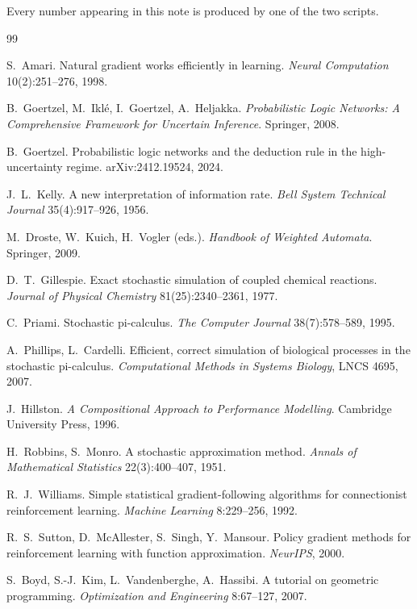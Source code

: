 \documentclass[11pt,a4paper]{article}
\theoremstyle{plain}
\theoremstyle{definition}
\theoremstyle{remark}
\begin{document}
Every number appearing in this note is produced by one of the two scripts.

\begin{thebibliography}{99}

S.~Amari. Natural gradient works efficiently in learning.
\emph{Neural Computation} 10(2):251--276, 1998.

B.~Goertzel, M.~Ikl\'e, I.~Goertzel, A.~Heljakka.
\emph{Probabilistic Logic Networks: A Comprehensive Framework for Uncertain
Inference}. Springer, 2008.

B.~Goertzel. Probabilistic logic networks and the deduction rule in the
high-uncertainty regime. arXiv:2412.19524, 2024.

J.~L.~Kelly. A new interpretation of information rate.
\emph{Bell System Technical Journal} 35(4):917--926, 1956.

M.~Droste, W.~Kuich, H.~Vogler (eds.).
\emph{Handbook of Weighted Automata}. Springer, 2009.

D.~T.~Gillespie. Exact stochastic simulation of coupled chemical reactions.
\emph{Journal of Physical Chemistry} 81(25):2340--2361, 1977.

C.~Priami. Stochastic pi-calculus.
\emph{The Computer Journal} 38(7):578--589, 1995.

A.~Phillips, L.~Cardelli. Efficient, correct simulation of biological processes
in the stochastic pi-calculus. \emph{Computational Methods in Systems Biology},
LNCS 4695, 2007.

J.~Hillston. \emph{A Compositional Approach to Performance Modelling}.
Cambridge University Press, 1996.

H.~Robbins, S.~Monro. A stochastic approximation method.
\emph{Annals of Mathematical Statistics} 22(3):400--407, 1951.

R.~J.~Williams. Simple statistical gradient-following algorithms for
connectionist reinforcement learning. \emph{Machine Learning} 8:229--256, 1992.

R.~S.~Sutton, D.~McAllester, S.~Singh, Y.~Mansour. Policy gradient methods for
reinforcement learning with function approximation. \emph{NeurIPS}, 2000.

S.~Boyd, S.-J.~Kim, L.~Vandenberghe, A.~Hassibi. A tutorial on geometric
programming. \emph{Optimization and Engineering} 8:67--127, 2007.


\end{thebibliography}
\end{document}
